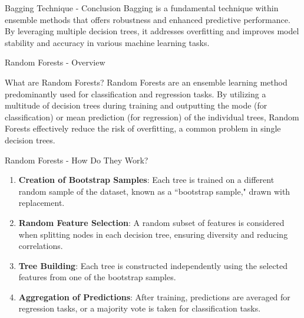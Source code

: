 \documentclass[aspectratio=169]{beamer}
\begin{document}
\begin{frame}[fragile]{Bagging Technique - Conclusion}
    Bagging is a fundamental technique within ensemble methods that offers robustness and enhanced predictive performance. By leveraging multiple decision trees, it addresses overfitting and improves model stability and accuracy in various machine learning tasks.
\end{frame}

\begin{frame}[fragile]{Random Forests - Overview}
    \begin{block}{What are Random Forests?}
        Random Forests are an ensemble learning method predominantly used for classification and regression tasks. 
        By utilizing a multitude of decision trees during training and outputting the mode (for classification) or 
        mean prediction (for regression) of the individual trees, Random Forests effectively reduce the risk of 
        overfitting, a common problem in single decision trees.
    \end{block}
\end{frame}

\begin{frame}[fragile]{Random Forests - How Do They Work?}
    \begin{enumerate}
        \item \textbf{Creation of Bootstrap Samples}: Each tree is trained on a different random sample of the dataset, known as a 
        ``bootstrap sample," drawn with replacement.
        
        \item \textbf{Random Feature Selection}: A random subset of features is considered when splitting nodes in each decision tree, 
        ensuring diversity and reducing correlations.
        
        \item \textbf{Tree Building}: Each tree is constructed independently using the selected features from one of the bootstrap samples.
        
        \item \textbf{Aggregation of Predictions}: After training, predictions are averaged for regression tasks, 
        or a majority vote is taken for classification tasks.
    \end{enumerate}
\end{frame}
\end{document}
